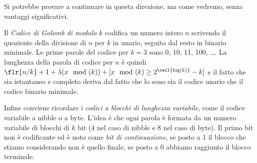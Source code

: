 Si potrebbe provare a continuare in questa direzione, ma come vedremo, senza vantaggi significativi.

Il \textit{Codice di Golomb di modulo $k$} \cite{golomb} codifica un numero intero $n$ scrivendo il quoziente della divisione di $n$ per $k$ in unario, seguito dal resto in binario minimale. Le prime parole del codice per $k = 3$ sono 0, 10, 11, 100, \dots. La lunghezza della parola di codice per $n$ è quindi $\flr{n/k} + 1 + \lambda(x\mod(k)) + [x\mod(k) \geq 2^{\ceil{\log(k)}} - k]$ e il fatto che sia istantaneo e completo deriva dal fatto che lo sono sia il codice unario che il codice binario minimale.

Infine conviene ricordare i \textit{codici a blocchi di lunghezza variabile}, come il codice variabile a nibble o a byte. L'idea è che ogni parola è formata da un numero variabile di blocchi di $k$ bit (4 nel caso di nibble e 8 nel caso di byte). Il primo bit non è codificante ed è noto come \textit{bit di continuazione}, se posto a 1 il blocco che stiamo considerando non è quello finale, se posto a 0 abbiamo raggiunto il blocco terminale.


